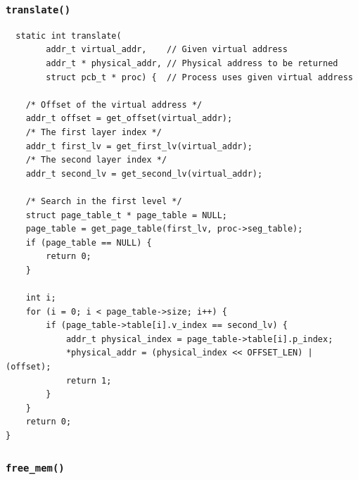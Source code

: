 \documentclass[a4paper]{article}
\numberwithin{equation}{section}
\begin{document}
\subsubsection{\texttt{translate()}}
\begin{mdframed}[leftline=false,rightline=false,backgroundcolor=blue!10,nobreak=false]
  \begin{verbatim}
  static int translate(
		addr_t virtual_addr, 	// Given virtual address
		addr_t * physical_addr, // Physical address to be returned
		struct pcb_t * proc) {  // Process uses given virtual address

	/* Offset of the virtual address */
	addr_t offset = get_offset(virtual_addr);
	/* The first layer index */
	addr_t first_lv = get_first_lv(virtual_addr);
	/* The second layer index */
	addr_t second_lv = get_second_lv(virtual_addr);
	
	/* Search in the first level */
	struct page_table_t * page_table = NULL;
	page_table = get_page_table(first_lv, proc->seg_table);
	if (page_table == NULL) {
		return 0;
	}

	int i;
	for (i = 0; i < page_table->size; i++) {
		if (page_table->table[i].v_index == second_lv) {
			addr_t physical_index = page_table->table[i].p_index;
			*physical_addr = (physical_index << OFFSET_LEN) | (offset);
            return 1;
		}
	}
	return 0;	
}
  \end{verbatim}
\end{mdframed}

\subsubsection{\texttt{free_mem()}}
\end{document}
